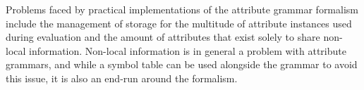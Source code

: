 Problems faced by practical implementations of the attribute grammar formalism include the management of storage for the multitude of attribute instances used during evaluation and the amount of attributes that exist solely to share non-local information. Non-local information is in general a problem with attribute grammars, and while a symbol table can be used alongside the grammar to avoid this issue, it is also an end-run around the formalism.

